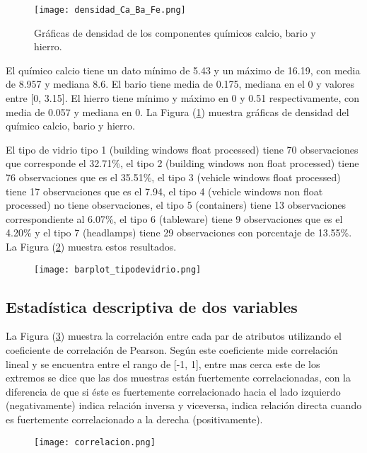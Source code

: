 \begin{figure}
	\centering
	\texttt{[image: densidad\_Ca\_Ba\_Fe.png]}
	\caption{Gráficas de densidad de los componentes químicos calcio, bario y hierro.} \label{fig:CaBaFe}
\end{figure}

El químico calcio tiene un dato mínimo de 5.43 y un máximo de 16.19, con media de 8.957 y mediana 8.6. El bario tiene media de 0.175, mediana en el 0 y valores entre [0, 3.15]. El hierro tiene mínimo y máximo en 0 y 0.51 respectivamente, con media de 0.057 y mediana en 0. La Figura (\ref{fig:CaBaFe}) muestra gráficas de densidad del químico calcio, bario y hierro.

El tipo de vidrio tipo 1 (building windows float processed) tiene 70 observaciones que corresponde el 32.71\%, el tipo 2 (building windows non float processed) tiene 76 observaciones que es el 35.51\%, el tipo 3 (vehicle windows float processed) tiene 17 observaciones que es el 7.94, el tipo 4 (vehicle windows non float processed) no tiene observaciones, el tipo 5 (containers) tiene 13 observaciones correspondiente al 6.07\%, el tipo 6 (tableware) tiene 9 observaciones que es el 4.20\% y el tipo 7 (headlamps) tiene 29 observaciones con porcentaje de 13.55\%. La Figura (\ref{fig:tipodevidrio}) muestra estos resultados.

\begin{figure}
	\centering
	\texttt{[image: barplot\_tipodevidrio.png]}
	\caption{} \label{fig:tipodevidrio}
\end{figure}

\subsection{Estadística descriptiva de dos variables} \label{subsec:estadisticadescriptivados}

La Figura (\ref{fig:correlacion}) muestra la correlaci\'on entre cada par de atributos utilizando el coeficiente de correlaci\'on de Pearson. Seg\'un \citet{benesty} este coeficiente mide correlaci\'on lineal y se encuentra entre el rango de [-1, 1], entre mas cerca este de los extremos se dice que las dos muestras est\'an fuertemente correlacionadas, con la diferencia de que si \'este es fuertemente correlacionado hacia el lado izquierdo (negativamente) indica relaci\'on inversa y viceversa, indica relaci\'on directa cuando es fuertemente correlacionado a la derecha (positivamente).

\begin{figure}
	\centering
	\texttt{[image: correlacion.png]}
	\caption{} \label{fig:correlacion}
\end{figure}

